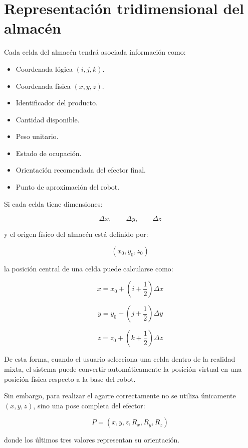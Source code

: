 \documentclass[12pt,letterpaper]{article}
\begin{document}
\section{Representación tridimensional del almacén}

Cada celda del almacén tendrá asociada información como:

\begin{itemize}[leftmargin=1.2cm]

    \item Coordenada lógica $(i,j,k)$.
    \item Coordenada física $(x,y,z)$.
    \item Identificador del producto.
    \item Cantidad disponible.
    \item Peso unitario.
    \item Estado de ocupación.
    \item Orientación recomendada del efector final.
    \item Punto de aproximación del robot.

\end{itemize}

Si cada celda tiene dimensiones:

\[
\Delta x,\qquad \Delta y,\qquad \Delta z
\]

y el origen físico del almacén está definido por:

\[
(x_0,y_0,z_0)
\]

la posición central de una celda puede calcularse como:

\[
x=x_0+\left(i+\frac{1}{2}\right)\Delta x
\]

\[
y=y_0+\left(j+\frac{1}{2}\right)\Delta y
\]

\[
z=z_0+\left(k+\frac{1}{2}\right)\Delta z
\]

De esta forma, cuando el usuario selecciona una celda dentro de la
realidad mixta, el sistema puede convertir automáticamente la posición
virtual en una posición física respecto a la base del robot.

Sin embargo, para realizar el agarre correctamente no se utiliza
únicamente $(x,y,z)$, sino una pose completa del efector:

\[
P =
(x,y,z,R_x,R_y,R_z)
\]

donde los últimos tres valores representan su orientación.

\end{document}
